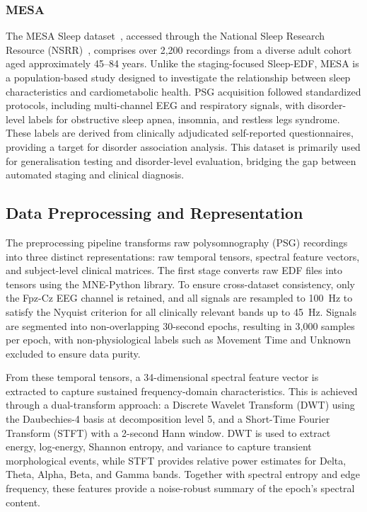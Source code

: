 \documentclass{ieeetj}
\begin{document}
\subsubsection{MESA}
The MESA Sleep dataset~\cite{mesa}, accessed through the National Sleep Research Resource (NSRR)~\cite{nsrr}, comprises over 2,200 recordings from a diverse adult cohort aged approximately 45--84 years. Unlike the staging-focused Sleep-EDF, MESA is a population-based study designed to investigate the relationship between sleep characteristics and cardiometabolic health. PSG acquisition followed standardized protocols, including multi-channel EEG and respiratory signals, with disorder-level labels for obstructive sleep apnea, insomnia, and restless legs syndrome. These labels are derived from clinically adjudicated self-reported questionnaires, providing a target for disorder association analysis. This dataset is primarily used for generalisation testing and disorder-level evaluation, bridging the gap between automated staging and clinical diagnosis.

\subsection{Data Preprocessing and Representation}
The preprocessing pipeline transforms raw polysomnography (PSG) recordings into three distinct representations: raw temporal tensors, spectral feature vectors, and subject-level clinical matrices. The first stage converts raw EDF files into tensors using the MNE-Python library. To ensure cross-dataset consistency, only the Fpz-Cz EEG channel is retained, and all signals are resampled to 100~Hz to satisfy the Nyquist criterion for all clinically relevant bands up to 45~Hz. Signals are segmented into non-overlapping 30-second epochs, resulting in 3,000 samples per epoch, with non-physiological labels such as Movement Time and Unknown excluded to ensure data purity.

From these temporal tensors, a 34-dimensional spectral feature vector is extracted to capture sustained frequency-domain characteristics. This is achieved through a dual-transform approach: a Discrete Wavelet Transform (DWT) using the Daubechies-4 basis at decomposition level 5, and a Short-Time Fourier Transform (STFT) with a 2-second Hann window. DWT is used to extract energy, log-energy, Shannon entropy, and variance to capture transient morphological events, while STFT provides relative power estimates for Delta, Theta, Alpha, Beta, and Gamma bands. Together with spectral entropy and edge frequency, these features provide a noise-robust summary of the epoch's spectral content.
\end{document}
